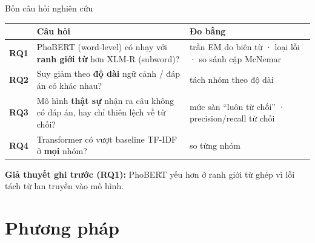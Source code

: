 \begin{frame}{Bốn câu hỏi nghiên cứu}
\small
\renewcommand{\arraystretch}{1.15}
\begin{tabularx}{\textwidth}{@{}l X X@{}}
\toprule
& \textbf{Câu hỏi} & \textbf{Đo bằng} \\
\midrule
\textbf{RQ1} & PhoBERT (word-level) có nhạy với \textbf{ranh giới từ} hơn XLM-R (subword)? & trần EM do biên từ · loại lỗi · so sánh cặp McNemar \\
\textbf{RQ2} & Suy giảm theo \textbf{độ dài} ngữ cảnh / đáp án có khác nhau? & tách nhóm theo độ dài \\
\textbf{RQ3} & Mô hình \textbf{thật sự} nhận ra câu không có đáp án, hay chỉ thiên lệch về từ chối? & mức sàn ``luôn từ chối'' · precision/recall từ chối \\
\textbf{RQ4} & Transformer có vượt baseline TF-IDF ở \textbf{mọi} nhóm? & so từng nhóm \\
\bottomrule
\end{tabularx}

\vspace{0.4em}
\textbf{Giả thuyết ghi trước (RQ1):} PhoBERT yếu hơn ở ranh giới từ ghép vì lỗi tách từ lan truyền vào mô hình.
\end{frame}

\section{Phương pháp}

